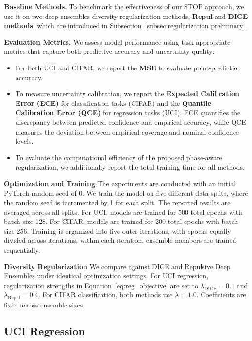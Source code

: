 \documentclass[sigconf]{acmart}
\begin{document}
\textbf{Baseline Methods.}
To benchmark the effectiveness of our STOP approach, we use it on two deep ensembles diversity regularization methods, \textbf{Repul} and \textbf{DICE methods}, which are introduced in Subsection~\ref{subsec:regularization prelimnary}.

\textbf{Evaluation Metrics.}
We assess model performance using task-appropriate metrics that capture both predictive accuracy and uncertainty quality:
\begin{itemize}
    \item For both UCI and CIFAR, we report the \textbf{MSE} to evaluate point-prediction accuracy.

    \item To measure uncertainty calibration, we report the \textbf{Expected Calibration Error (ECE)} for classification tasks (CIFAR) and the \textbf{Quantile Calibration Error (QCE)} for regression tasks (UCI). ECE quantifies the discrepancy between predicted confidence and empirical accuracy, while QCE measures the deviation between empirical coverage and nominal confidence levels.

    \item To evaluate the computational efficiency of the proposed phase-aware regularization, we additionally report the total training time for all methods.
\end{itemize}



\textbf{Optimization and Training} The experiments are conducted with an initial PyTorch random seed of 0. We train the model on five different data splits, where the random seed is incremented by 1 for each split. The reported results are averaged across all splits. For UCI, models are trained for 500 total epochs with batch size 128. For CIFAR, models are trained for 200 total epochs with batch size 256.
Training is organized into five outer iterations, with epochs equally divided across iterations; within each iteration, ensemble members are trained sequentially.


\textbf{Diversity Regularization} We compare against DICE and Repulsive Deep Ensembles under identical optimization settings.
For UCI regression, regularization strengths in Equation~\ref{eq:reg_objective} are set to $\lambda_{\text{DICE}}=0.1$ and $\lambda_{\text{Repul}}=0.4$.
For CIFAR classification, both methods use $\lambda=1.0$.
Coefficients are fixed across ensemble sizes.

\subsection{UCI Regression}
\label{subsec: uci}
\end{document}
